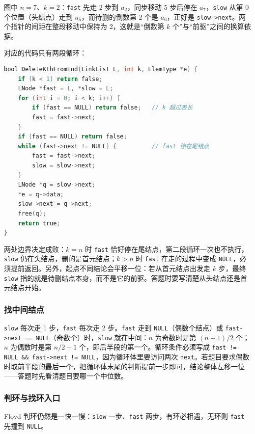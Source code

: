图中 $n=7$、$k=2$：\texttt{fast} 先走 2 步到 $a_2$，同步移动 5 步后停在 $a_7$，\texttt{slow} 从第 0 个位置（头结点）走到 $a_5$，而待删的倒数第 2 个是 $a_6$，正好是 \texttt{slow->next}。两个指针的间距在整段移动中保持为 2，这就是“倒数第 $k$ 个”与“前驱”之间的换算依据。

对应的代码只有两段循环：

\begin{lstlisting}[language=C]
bool DeleteKthFromEnd(LinkList L, int k, ElemType *e) {
    if (k < 1) return false;
    LNode *fast = L, *slow = L;
    for (int i = 0; i < k; i++) {
        if (fast == NULL) return false;   // k 超过表长
        fast = fast->next;
    }
    if (fast == NULL) return false;
    while (fast->next != NULL) {          // fast 停在尾结点
        fast = fast->next;
        slow = slow->next;
    }
    LNode *q = slow->next;
    *e = q->data;
    slow->next = q->next;
    free(q);
    return true;
}
\end{lstlisting}

两处边界决定成败：$k=n$ 时 \texttt{fast} 恰好停在尾结点，第二段循环一次也不执行，\texttt{slow} 仍在头结点，删的是首元结点；$k>n$ 时 \texttt{fast} 在走的过程中变成 \texttt{NULL}，必须提前返回。另外，起点不同结论会平移一位：若从首元结点出发走 $k$ 步，最终 \texttt{slow} 指的就是待删结点本身，而不是它的前驱。答题时要写清楚从头结点还是首元结点开始。

\subsubsection{找中间结点}

\texttt{slow} 每次走 1 步，\texttt{fast} 每次走 2 步。\texttt{fast} 走到 \texttt{NULL}（偶数个结点）或 \texttt{fast->next == NULL}（奇数个）时，\texttt{slow} 就在中间：$n$ 为奇数时是第 $(n+1)/2$ 个；$n$ 为偶数时是第 $n/2+1$ 个，即后半段的第一个。循环条件必须写成 \texttt{fast != NULL \&\& fast->next != NULL}，因为循环体里要访问两次 \texttt{next}。若题目要求偶数时取前半段的最后一个，把循环体末尾的判断提前一步即可，结论整体左移一位——答题时先看清题目要哪一个中位数。

\subsubsection{判环与找环入口}

Floyd 判环仍然是一快一慢：\texttt{slow} 一步、\texttt{fast} 两步，有环必相遇，无环则 \texttt{fast} 先撞到 \texttt{NULL}。

